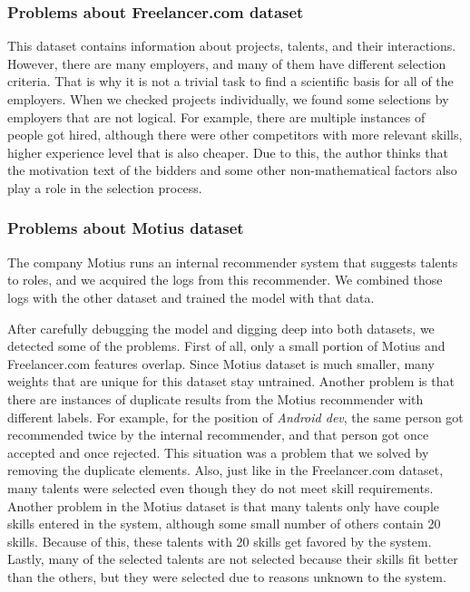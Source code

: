 \subsubsection{Problems about Freelancer.com dataset}

This dataset contains information about projects, talents, and their interactions. However, there are many employers, and many of them have different selection criteria. That is why it is not a trivial task to find a scientific basis for all of the employers. When we checked projects individually, we found some selections by employers that are not logical. For example, there are multiple instances of people got hired, although there were other competitors with more relevant skills, higher experience level that is also cheaper. Due to this, the author thinks that the motivation text of the bidders and some other non-mathematical factors also play a role in the selection process. 

\subsubsection{Problems about Motius dataset}

The company Motius runs an internal recommender system that suggests talents to roles, and we acquired the logs from this recommender. We combined those logs with the other dataset and trained the model with that data.

After carefully debugging the model and digging deep into both datasets, we detected some of the problems. First of all, only a small portion of Motius and Freelancer.com features overlap. Since Motius dataset is much smaller, many weights that are unique for this dataset stay untrained. Another problem is that there are instances of duplicate results from the Motius recommender with different labels. For example, for the position of \textit{Android dev}, the same person got recommended twice by the internal recommender, and that person got once accepted and once rejected. This situation was a problem that we solved by removing the duplicate elements. Also, just like in the Freelancer.com dataset, many talents were selected even though they do not meet skill requirements. Another problem in the Motius dataset is that many talents only have couple skills entered in the system, although some small number of others contain 20 skills. Because of this, these talents with 20 skills get favored by the system. Lastly,  many of the selected talents are not selected because their skills fit better than the others, but they were selected due to reasons unknown to the system.

